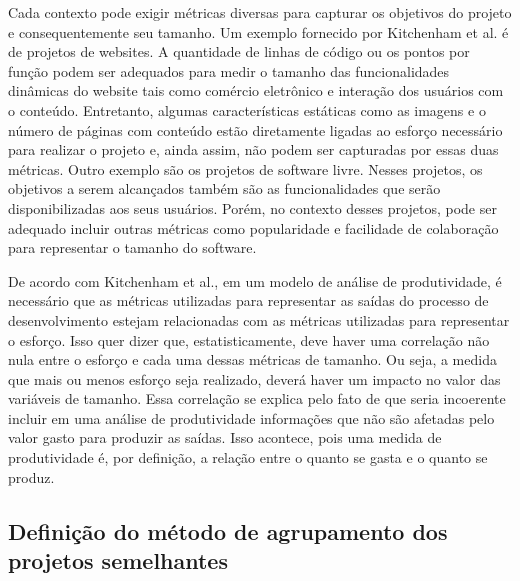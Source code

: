 Cada contexto pode exigir métricas diversas para capturar os objetivos do projeto e consequentemente seu tamanho. Um exemplo fornecido por Kitchenham et al.\cite{kitchenham2004software} é de projetos de websites. A quantidade de linhas de código ou os pontos por função podem ser adequados para medir o tamanho das funcionalidades dinâmicas do website tais como comércio eletrônico e  interação dos usuários com o conteúdo. Entretanto, algumas características estáticas como as imagens e o número de páginas com conteúdo estão diretamente ligadas ao esforço necessário para realizar o projeto e, ainda assim, não podem ser capturadas por essas duas métricas. Outro exemplo são os projetos de software livre.  Nesses projetos, os objetivos a serem alcançados também são as funcionalidades que serão disponibilizadas aos seus usuários. Porém, no contexto desses projetos, pode ser adequado incluir outras métricas como popularidade e facilidade de colaboração para representar o tamanho do software. 

De acordo com Kitchenham et al.\cite{kitchenham2004software}, em um modelo de análise de produtividade, é necessário que as métricas utilizadas para representar as saídas do processo de desenvolvimento estejam relacionadas com as métricas utilizadas para representar o esforço. Isso quer dizer que, estatisticamente, deve haver uma correlação não nula entre o esforço e cada uma dessas métricas de tamanho. Ou seja, a medida que mais ou menos esforço seja realizado, deverá haver um impacto no valor das variáveis de tamanho. Essa correlação se explica pelo fato de que seria incoerente incluir em uma análise de produtividade informações que não são afetadas pelo valor gasto para produzir as saídas. Isso acontece, pois uma medida de produtividade é, por definição, a relação entre o quanto se gasta e o quanto se produz. 







\subsection{Definição do método de agrupamento dos projetos semelhantes }

